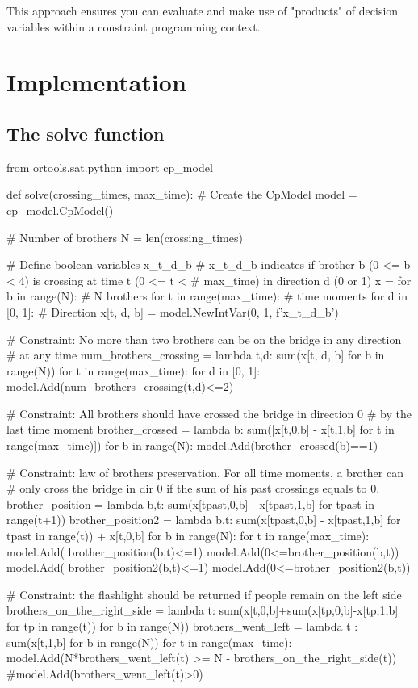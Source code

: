 This approach ensures you can evaluate and make use of "products" of decision
variables within a constraint programming context.

\section{Implementation}

\subsection{The solve function}

\begin{python}
from ortools.sat.python import cp_model

def solve(crossing_times, max_time):
  # Create the CpModel
  model = cp_model.CpModel()

  # Number of brothers
  N = len(crossing_times)

  # Define boolean variables x_t_d_b
  # x_t_d_b indicates if brother b (0 <= b < 4) is crossing at time t (0 <= t <
  # max_time) in direction d (0 or 1)
  x = {}
  for b in range(N):  # N brothers
    for t in range(max_time):  # time moments
      for d in [0, 1]:  # Direction
        x[t, d, b] = model.NewIntVar(0, 1, f'x_{t}_{d}_{b}')

  # Constraint: No more than two brothers can be on the bridge in any direction
  # at any time
  num_brothers_crossing = lambda t,d: sum(x[t, d, b] for b in range(N))
  for t in range(max_time):
    for d in [0, 1]:
      model.Add(num_brothers_crossing(t,d)<=2)

  # Constraint: All brothers should have crossed the bridge in direction 0
  # by the last time moment
  brother_crossed = lambda b: sum([x[t,0,b] - x[t,1,b] for t in range(max_time)])
  for b in range(N):
    model.Add(brother_crossed(b)==1)

  # Constraint: law of brothers preservation. For all time moments, a brother can
  # only cross the bridge in dir 0 if the sum of his past crossings equals to 0.
  brother_position = lambda b,t: sum(x[tpast,0,b] - x[tpast,1,b] for tpast in range(t+1))
  brother_position2 = lambda b,t: sum(x[tpast,0,b] - x[tpast,1,b] for tpast in range(t)) + x[t,0,b]
  for b in range(N):
    for t in range(max_time):
      model.Add(   brother_position(b,t)<=1)
      model.Add(0<=brother_position(b,t))
      model.Add(   brother_position2(b,t)<=1)
      model.Add(0<=brother_position2(b,t))

  # Constraint: the flashlight should be returned if people remain on the left side
  brothers_on_the_right_side = lambda t: sum(x[t,0,b]+sum(x[tp,0,b]-x[tp,1,b] for tp in range(t)) for b in range(N))
  brothers_went_left = lambda t : sum(x[t,1,b] for b in range(N))
  for t in range(max_time):
    model.Add(N*brothers_went_left(t) >= N - brothers_on_the_right_side(t))
    #model.Add(brothers_went_left(t)>0)



\end{python}
